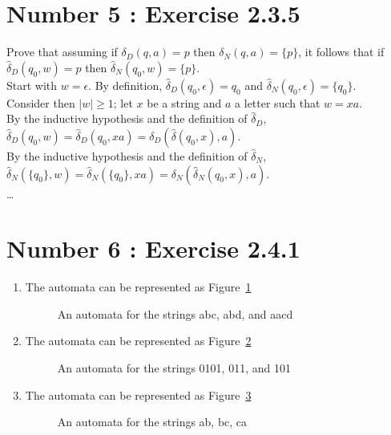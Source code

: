 \documentclass[12pt,a4paper,twoside]{article}  %
\begin{document}
\section{Number 5 : Exercise 2.3.5}

Prove that assuming if $\delta_D(q, a) = p$ then $\delta_N(q, a) =
 \{p\}$, it follows that if $\hat \delta_D(q_0, w) = p$ then $\hat
 \delta_N(q_0,w) = \{p\}$. \\
 Start with $w = \epsilon$. By definition, $\hat \delta_D(q_0,
 \epsilon) = q_0$ and $\hat \delta_N(q_0, \epsilon) = \{q_0\}$.  \\
 Consider then $|w| \geq 1$; let $x$ be a string and $a$ a letter such
 that $w = xa$. \\
 By the inductive hypothesis and the definition of $\hat \delta_D$,
 $\hat \delta_D(q_0, w) = \hat \delta_D(q_0, xa) = \delta_D(\hat
 \delta(q_0, x), a)$. \\
 By the inductive hypothesis and the definition of $\hat \delta_N$,
 $\hat \delta_N(\{q_0\}, w) = \hat \delta_N(\{q_0\}, xa) =
 \delta_N(\hat \delta_N(q_0, x), a)$. \\
 \ldots

\section{Number 6 : Exercise 2.4.1}
\begin{enumerate}

\item The automata can be represented as Figure~\ref{2.4.1.a}
\begin{figure}

\caption{An automata for the strings abc, abd, and aacd}\label{2.4.1.a}
\end{figure}

\item The automata can be represented as Figure~\ref{2.4.1.b}
\begin{figure}

\caption{An automata for the strings 0101, 011, and 101}\label{2.4.1.b}
\end{figure}

\item The automata can be represented as Figure~\ref{2.4.1.c}
\begin{figure}

\caption{An automata for the strings ab, bc, ca}\label{2.4.1.c}
\end{figure}

\end{enumerate}
\end{document}
